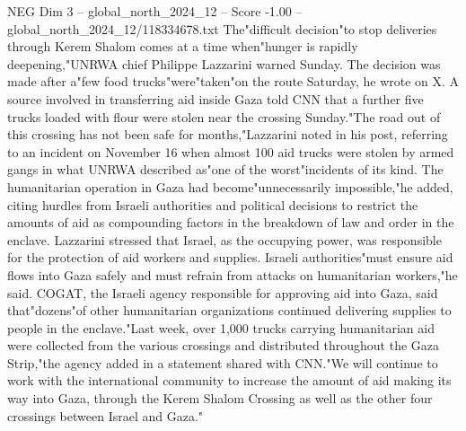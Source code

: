 \begin{textsample}{NEG Dim 3 – global\_north\_2024\_12 – Score -1.00 – global\_north\_2024\_12/118334678.txt}
The"difficult decision"to stop deliveries through Kerem Shalom comes at a time when"hunger is rapidly deepening,"UNRWA chief Philippe Lazzarini warned Sunday.
The decision was made after a"few food trucks"were"taken"on the route Saturday, he wrote on X.
A source involved in transferring aid inside Gaza told CNN that a further five trucks loaded with flour were stolen near the crossing Sunday."The road out of this crossing has not been safe for months,"Lazzarini noted in his post, referring to an incident on November 16 when almost 100 aid trucks were stolen by armed gangs in what UNRWA described as"one of the worst"incidents of its kind.
The humanitarian operation in Gaza had become"unnecessarily impossible,"he added, citing hurdles from Israeli authorities and political decisions to restrict the amounts of aid as compounding factors in the breakdown of law and order in the enclave.
Lazzarini stressed that Israel, as the occupying power, was responsible for the protection of aid workers and supplies.
Israeli authorities"must ensure aid flows into Gaza safely and must refrain from attacks on humanitarian workers,"he said.
COGAT, the Israeli agency responsible for approving aid into Gaza, said that"dozens"of other humanitarian organizations continued delivering supplies to people in the enclave."Last week, over 1,000 trucks carrying humanitarian aid were collected from the various crossings and distributed throughout the Gaza Strip,"the agency added in a statement shared with CNN."We will continue to work with the international community to increase the amount of aid making its way into Gaza, through the Kerem Shalom Crossing as well as the other four crossings between Israel and Gaza."

\end{textsample}
